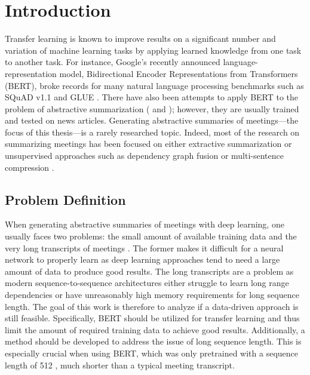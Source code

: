 \chapter{Introduction}\label{ch:Introduction}


Transfer learning is known to improve results on a significant number and variation of machine learning tasks by applying learned knowledge from one task to another task.
For instance, Google's recently announced language-representation model, Bidirectional Encoder Representations from Transformers (BERT), broke records for many natural language processing benchmarks \cite[p.~5--7]{devlin2018bert} such as  SQuAD v1.1 \cite{rajpurkar-etal-2016-squad} and GLUE \cite{1804.07461}.
There have also been attempts to apply BERT to the problem of abstractive summarization (\cite{1902.09243} and \cite{1908.08345}); however, they are usually trained and tested on news articles.
Generating abstractive summaries of meetings---the focus of this thesis---is a rarely researched topic. %
Indeed, most of the research on summarizing meetings has been focused on either extractive summarization or unsupervised approaches such as dependency graph fusion \cite{1609.07035} or multi-sentence compression \cite{shang-etal-2018-unsupervised}.


\section{Problem Definition}

When generating abstractive summaries of meetings with deep learning, one usually faces two problems: the small amount of available training data and the very long transcripts of meetings \cite[p.~650--651]{10.1007/978-3-030-20521-8_53}.
The former makes it difficult for a neural network to properly learn as deep learning approaches tend to need a large amount of data to produce good results.
The long transcripts are a problem as modern sequence-to-sequence architectures either struggle to learn long range dependencies \cite{Hochreiter01gradientflow} or have unreasonably high memory requirements for long sequence length.
The goal of this work is therefore to analyze if a data-driven approach is still feasible. %
Specifically, BERT should be utilized for transfer learning and thus limit the amount of required training data to achieve good results.
Additionally, a method should be developed to address the issue of long sequence length.
This is especially crucial when using BERT, which was only pretrained with a sequence length of 512 \cite[p.~13]{devlin2018bert}, much shorter than a typical meeting transcript.

